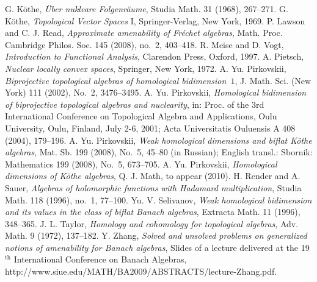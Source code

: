 \documentclass[12pt,reqno]{amsart}
\theoremstyle{definition}
\begin{document}
\begin{thebibliography}{99}
G. K\"othe,
{\em \"Uber nukleare Folgenr\"aume},
Studia Math. 31 (1968), 267--271.
G. K\"othe,
{\em Topological Vector Spaces} I,
Springer-Verlag, New York, 1969.
P. Lawson and C. J. Read,
{\em Approximate amenability of Fr\'echet algebras},
Math. Proc. Cambridge Philos. Soc. 145 (2008), no.~2, 403--418.
R. Meise and D. Vogt,
{\em Introduction to Functional Analysis},
Clarendon Press, Oxford, 1997.
A. Pietsch,
{\em Nuclear locally convex spaces},
Springer, New York, 1972.
A. Yu. Pirkovskii,
{\em Biprojective topological algebras of homological bidimension~$1$},
J. Math. Sci. (New York) 111 (2002), No.~2, 3476--3495.
A. Yu. Pirkovskii,
{\em Homological bidimension of biprojective topological algebras
and nuclearity},
in: Proc. of the 3rd International Conference on Topological
Algebra and Applications, Oulu University, Oulu,
Finland, July 2-6, 2001; Acta Universitatis Ouluensis A
408 (2004), 179--196.
A. Yu. Pirkovskii,
{\em Weak homological dimensions and biflat K\"othe algebras},
Mat. Sb. 199 (2008), No.~5, 45--80 (in Russian); English transl.:
Sbornik: Mathematics 199 (2008), No.~5, 673--705.
A. Yu. Pirkovskii,
{\em Homological dimensions of K\"othe algebras},
Q. J. Math, to appear (2010).
H. Render and A. Sauer,
{\em Algebras of holomorphic functions with Hadamard multiplication},
Studia Math. 118 (1996), no.~1, 77--100.
Yu. V. Selivanov,
{\em Weak homological bidimension and its values in
the class of biflat Banach algebras},
Extracta Math. 11 (1996), 348--365.
J. L. Taylor,
{\em Homology and cohomology for topological algebras},
Adv. Math. 9 (1972), 137--182.
Y. Zhang,
{\em Solved and unsolved problems on
generalized notions of amenability for Banach
algebras},
Slides of a lecture delivered at the 19$^\mathrm{th}$
International Conference on Banach Algebras,
{\ttfamily http://www.siue.edu/MATH/BA2009/ABSTRACTS/lecture-Zhang.pdf}.
\end{thebibliography}
\end{document}
